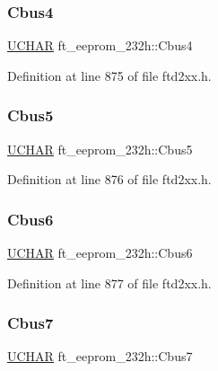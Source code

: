 \subsubsection{\texorpdfstring{Cbus4}{Cbus4}}
{\footnotesize\ttfamily \hyperlink{CatCaloProto40MHz_2inc_2WinTypes_8h_a4f4bb67531a9bf6f0b9c6ad76aeba587}{U\+C\+H\+AR} ft\+\_\+eeprom\+\_\+232h\+::\+Cbus4}



Definition at line 875 of file ftd2xx.\+h.

\mbox{\label{structft__eeprom__232h_ad90423b70af5820736e9da55335c54c2}} 
\subsubsection{\texorpdfstring{Cbus5}{Cbus5}}
{\footnotesize\ttfamily \hyperlink{CatCaloProto40MHz_2inc_2WinTypes_8h_a4f4bb67531a9bf6f0b9c6ad76aeba587}{U\+C\+H\+AR} ft\+\_\+eeprom\+\_\+232h\+::\+Cbus5}



Definition at line 876 of file ftd2xx.\+h.

\mbox{\label{structft__eeprom__232h_aef814f4e06e21a78bddcf36d4ef4eda6}} 
\subsubsection{\texorpdfstring{Cbus6}{Cbus6}}
{\footnotesize\ttfamily \hyperlink{CatCaloProto40MHz_2inc_2WinTypes_8h_a4f4bb67531a9bf6f0b9c6ad76aeba587}{U\+C\+H\+AR} ft\+\_\+eeprom\+\_\+232h\+::\+Cbus6}



Definition at line 877 of file ftd2xx.\+h.

\mbox{\label{structft__eeprom__232h_aadc831e39e9fccc0e6fc96d090a9bd8d}} 
\subsubsection{\texorpdfstring{Cbus7}{Cbus7}}
{\footnotesize\ttfamily \hyperlink{CatCaloProto40MHz_2inc_2WinTypes_8h_a4f4bb67531a9bf6f0b9c6ad76aeba587}{U\+C\+H\+AR} ft\+\_\+eeprom\+\_\+232h\+::\+Cbus7}



